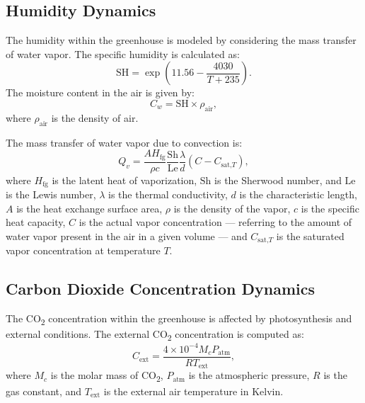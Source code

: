 \documentclass[conference]{IEEEtran}
\begin{document}
\subsection{Humidity Dynamics}\label{subsec:humidity}

The humidity within the greenhouse is modeled by considering the mass transfer of water vapor. The specific humidity is calculated as:
\begin{equation}
    \text{SH} = \exp\left(11.56 - \frac{4030}{T + 235}\right).
\end{equation}
The moisture content in the air is given by:
\begin{equation}
    C_w = \text{SH} \times \rho_{\text{air}},
\end{equation}
where \(\rho_{\text{air}}\) is the density of air.

The mass transfer of water vapor due to convection is:
\begin{equation}
    Q_{v} = \frac{A  H_{\text{fg}}}{\rho  c}  \frac{\text{Sh}}{\text{Le}}  \frac{\lambda}{d}  \left( C - C_{\text{sat,}T} \right),
\end{equation}
where \(H_{\text{fg}}\) is the latent heat of vaporization, \(\text{Sh}\) is the Sherwood number, and \(\text{Le}\) is the Lewis number, \(\lambda \) is the thermal conductivity, \(d\) is the characteristic length, \(A\) is the heat exchange surface area, \(\rho \) is the density of the vapor, \(c\) is the specific heat capacity, \(C\) is the actual vapor concentration --- referring  to the amount of water vapor present in the air in a given volume --- and \(C_{\text{sat,}T}\) is the saturated vapor concentration at temperature \(T\).

\subsection{Carbon Dioxide Concentration Dynamics}

The CO\textsubscript{2} concentration within the greenhouse is affected by photosynthesis and external conditions. The external CO\textsubscript{2} concentration is computed as:
\begin{equation}
    C_{\text{ext}} = \frac{4 \times 10^{-4}  M_c  P_{\text{atm}}}{R  T_{\text{ext}}},
\end{equation}
where \(M_c\) is the molar mass of CO\textsubscript{2}, \(P_{\text{atm}}\) is the atmospheric pressure, \(R\) is the gas constant, and \(T_{\text{ext}}\) is the external air temperature in Kelvin.
\end{document}
